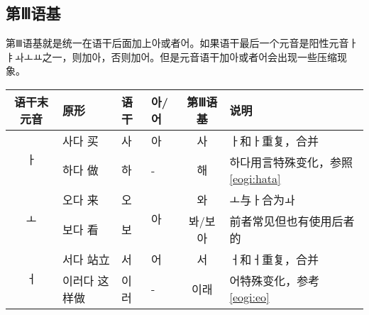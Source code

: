 \subsection{第Ⅲ语基}
第Ⅲ语基就是统一在语干后面加上아或者어。如果语干最后一个元音是阳性元音{\kr ㅏㅑㅘㅗㅛ}之一，则加아，否则加어。但是元音语干加아或者어会出现一些压缩现象。\\
\begin{tabular}{|c|l|l|l|c|l|}
    \hline
    语干末元音&原形&语干&아/어&第Ⅲ语基&说明\\\hline
    \multirow{2}{*}{ㅏ}&사다 买&사&아&사&ㅏ和ㅏ重复，合并\\\cline{2-6}
    &하다 做&하&-&해&하다用言特殊变化，参照\ref{eogi:hata}\\\hline
    \multirow{2}{*}{ㅗ}&오다 来&오&\multirow{2}{*}{아}&와&ㅗ与ㅏ合为ㅘ\\\cline{2-3}\cline{5-6}
    &보다 看&보&&봐/보아&前者常见但也有使用后者的\\\hline
    \multirow{2}{*}{ㅓ}&서다 站立&서&어&서&ㅓ和ㅓ重复，合并\\\cline{2-6}
    &이러다 这样做&이러&-&이래&어特殊变化，参考\ref{eogi:eo}\\\hline
\end{tabular}\\
